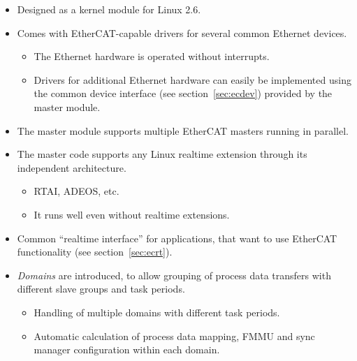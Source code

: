 \documentclass[a4paper,12pt,BCOR6mm,bibtotoc,idxtotoc]{scrbook}
\begin{document}
\begin{itemize}

\item Designed as a kernel module for Linux 2.6.

\item Comes with EtherCAT-capable drivers for several common Ethernet devices.

  \begin{itemize}

  \item The Ethernet hardware is operated without interrupts.

  \item Drivers for additional Ethernet hardware can easily be implemented
  using the common device interface (see section~\ref{sec:ecdev}) provided by
  the master module.

  \end{itemize}

\item The master module supports multiple EtherCAT masters running in
parallel.

\item The master code supports any Linux realtime extension through its
independent architecture.

  \begin{itemize}

  \item RTAI,
  ADEOS, etc.

  \item It runs well even without realtime extensions.

  \end{itemize}

\item Common ``realtime interface'' for applications, that want to use
EtherCAT functionality (see section~\ref{sec:ecrt}).

\item \textit{Domains} are introduced, to allow grouping of process
  data transfers with different slave groups and task periods.

  \begin{itemize}

  \item Handling of multiple domains with different task periods.

  \item Automatic calculation of process data mapping, FMMU and sync manager
  configuration within each domain.


\end{itemize}
\end{itemize}
\end{document}
